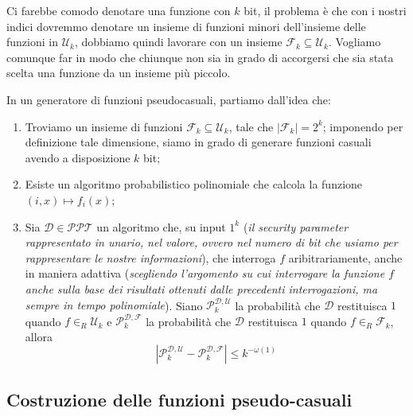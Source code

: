 Ci farebbe comodo denotare una funzione con $k$ bit, il problema è che con i nostri indici dovremmo 
denotare un insieme di funzioni minori dell'insieme delle funzioni in $\mathcal{U}_k$, dobbiamo 
quindi lavorare con un insieme $\mathcal{F}_k \subseteq \mathcal{U}_k$. Vogliamo comunque 
far in modo che chiunque non sia in grado di accorgersi che sia stata scelta una funzione
da un insieme più piccolo.

In un generatore di funzioni pseudocasuali, partiamo dall'idea che:
\begin{enumerate}
    \item Troviamo un insieme di funzioni
    $\mathcal{F}_k \subseteq \mathcal{U}_k$, tale che $|\mathcal{F}_k| = 2^k$; imponendo per definizione
    tale dimensione, siamo in grado di generare funzioni casuali avendo a disposizione $k$ bit;
    \item Esiste un algoritmo probabilistico polinomiale che calcola la funzione $(i,x) \mapsto f_i(x)$;
    \item Sia $\mathcal{D}\in \mathcal{PPT}$ un algoritmo che, su input $1^k$ (\textit{il 
    security parameter rappresentato in unario, nel valore, ovvero nel numero di bit che
    usiamo per rappresentare le nostre informazioni}), che interroga $f$ aribitrariamente,
    anche in maniera adattiva (\textit{scegliendo l'argomento su cui interrogare la funzione 
    $f$ anche sulla base dei risultati ottenuti dalle precedenti interrogazioni, ma sempre in 
    tempo polinomiale}). Siano $\mathcal{P}_k^{\mathcal{D}, \mathcal{U}}$ la probabilità che 
    $\mathcal{D}$ restituisca $1$ quando $f\in_R \mathcal{U}_k$ e $\mathcal{P}_k^{\mathcal{D}, \mathcal{F}}$
    la probabilità che $\mathcal{D}$ restituisca $1$ quando $f\in_R \mathcal{F}_k$, allora 
    \[
        \left| \mathcal{P}_k^{\mathcal{D}, \mathcal{U}} - \mathcal{P}_k^{\mathcal{D}, \mathcal{F}} \right| \leq k^{-\omega(1)}
    \]
\end{enumerate}
\subsection{Costruzione delle funzioni pseudo-casuali}
